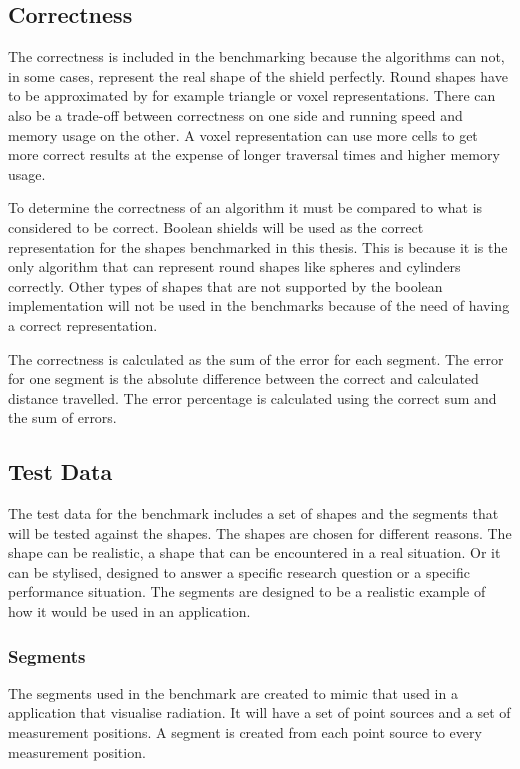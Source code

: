 \documentclass[11pt,twoside,a4paper]{report}
\begin{document}
\subsection{Correctness}
The correctness is included in the benchmarking because the algorithms can not, in some cases, represent the real shape of the shield perfectly. Round shapes have to be approximated by for example triangle or voxel representations. There can also be a trade-off between correctness on one side and running speed and memory usage on the other. A voxel representation can use more cells to get more correct results at the expense of longer traversal times and higher memory usage. 

To determine the correctness of an algorithm it must be compared to what is considered to be correct. Boolean shields will be used as the correct representation for the shapes benchmarked in this thesis. This is because it is the only algorithm that can represent round shapes like spheres and cylinders correctly. Other types of shapes that are not supported by the boolean implementation will not be used in the benchmarks because of the need of having a correct representation.

The correctness is calculated as the sum of the error for each segment. The error for one segment is the absolute difference between the correct and calculated distance travelled. The error percentage is calculated using the correct sum and the sum of errors.

\subsection{Test Data}
The test data for the benchmark includes a set of shapes and the segments that will be tested against the shapes. The shapes are chosen for different reasons. The shape can be realistic, a shape that can be encountered in a real situation. Or it can be stylised, designed to answer a specific research question or a specific performance situation. The segments are designed to be a realistic example of how it would be used in an application.

\subsubsection{Segments}
The segments used in the benchmark are created to mimic that used in a application that visualise radiation. It will have a set of point sources and a set of measurement positions. A segment is created from each point source to every measurement position.  
\end{document}

